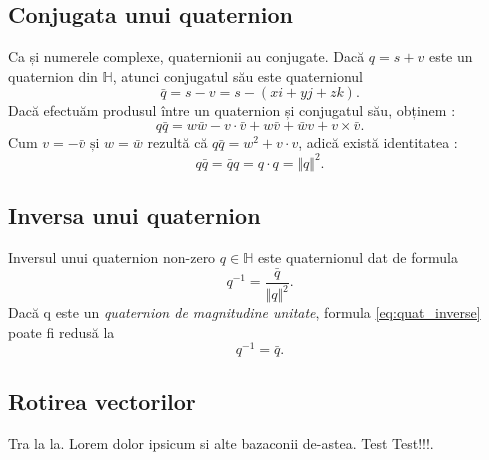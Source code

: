 \subsection{Conjugata unui quaternion}
\label{ch1:quaternions:conjugate}
Ca și numerele complexe, quaternionii au conjugate.
Dacă $q = s + v$ este un quaternion din $\mathbb{H}$, atunci conjugatul său este
quaternionul
\begin{equation}
\bar{q} = s - v = s - (x\mathit{i} + y\mathit{j} + z\mathit{k}).
\end{equation}
Dacă efectuăm produsul între un quaternion și conjugatul său, obținem :
\[
q\bar{q} = w\bar{w} - v \cdot \bar{v} + w\bar{v} + \bar{w}v + v \times \bar{v}.
\]
Cum $v = -\bar{v} \text{ și } w = \bar{w}$ rezultă că $q\bar{q} = w^2 +
v\cdot v$, adică există identitatea : 
\begin{equation}
q\bar{q} = \bar{q}q = q \cdot q = \Vert q \Vert ^ 2.
\end{equation}

\subsection{Inversa unui quaternion}
\label{ch1:quaternions:inverse}
Inversul unui quaternion non-zero $q \in \mathbb{H}$ este quaternionul dat de 
formula
\begin{equation}
\label{eq:quat_inverse}
q^{-1} = \frac{\bar{q}}{\Vert q \Vert ^ 2}.
\end{equation}
Dacă q este un \textit{quaternion de magnitudine unitate}, formula
\eqref{eq:quat_inverse} poate fi redusă la
\begin{equation}
q^{-1} = \bar{q}.
\end{equation}

\subsection{Rotirea vectorilor}
\label{ch1:quaternions:vector_rotation}
Tra la la. Lorem dolor ipsicum si alte bazaconii de-astea. Test Test!!!.